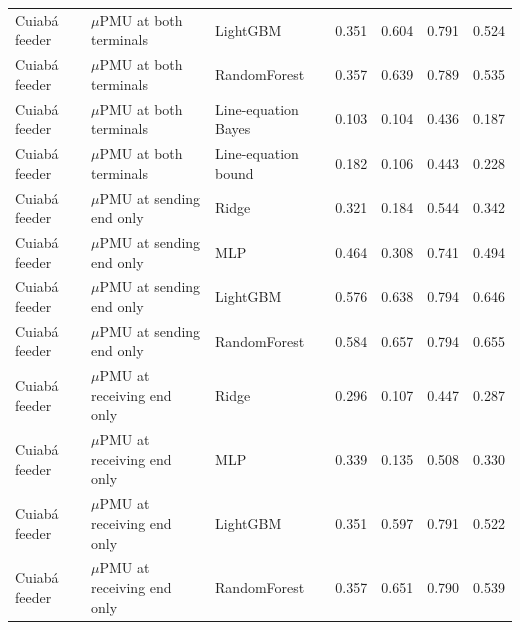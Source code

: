 \begin{table}[htbp]
{\begin{tabular}{lllrrrr}
Cuiabá feeder & $\mu$PMU at both terminals & LightGBM & 0.351 & 0.604 & 0.791 & 0.524 \\
Cuiabá feeder & $\mu$PMU at both terminals & RandomForest & 0.357 & 0.639 & 0.789 & 0.535 \\
Cuiabá feeder & $\mu$PMU at both terminals & Line-equation Bayes & 0.103 & 0.104 & 0.436 & 0.187 \\
Cuiabá feeder & $\mu$PMU at both terminals & Line-equation bound & 0.182 & 0.106 & 0.443 & 0.228 \\
Cuiabá feeder & $\mu$PMU at sending end only & Ridge & 0.321 & 0.184 & 0.544 & 0.342 \\
Cuiabá feeder & $\mu$PMU at sending end only & MLP & 0.464 & 0.308 & 0.741 & 0.494 \\
Cuiabá feeder & $\mu$PMU at sending end only & LightGBM & 0.576 & 0.638 & 0.794 & 0.646 \\
Cuiabá feeder & $\mu$PMU at sending end only & RandomForest & 0.584 & 0.657 & 0.794 & 0.655 \\
Cuiabá feeder & $\mu$PMU at receiving end only & Ridge & 0.296 & 0.107 & 0.447 & 0.287 \\
Cuiabá feeder & $\mu$PMU at receiving end only & MLP & 0.339 & 0.135 & 0.508 & 0.330 \\
Cuiabá feeder & $\mu$PMU at receiving end only & LightGBM & 0.351 & 0.597 & 0.791 & 0.522 \\
Cuiabá feeder & $\mu$PMU at receiving end only & RandomForest & 0.357 & 0.651 & 0.790 & 0.539 \\
\bottomrule
\end{tabular}
}
\end{table}
